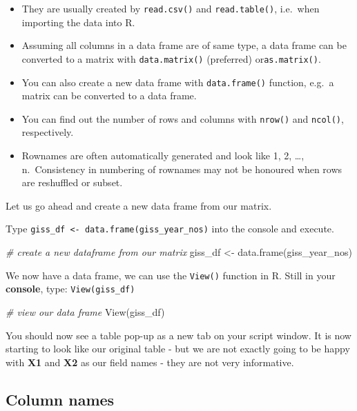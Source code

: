 \documentclass[
]{book}
\newenvironment{Shaded}{\begin{snugshade}}{\end{snugshade}}
\newcommand{\CommentTok}[1]{\textcolor[rgb]{0.56,0.35,0.01}{\textit{#1}}}
\newcommand{\FunctionTok}[1]{\textcolor[rgb]{0.00,0.00,0.00}{#1}}
\newcommand{\NormalTok}[1]{#1}
\newcommand{\OtherTok}[1]{\textcolor[rgb]{0.56,0.35,0.01}{#1}}
\providecommand{\tightlist}{%
  \setlength{\itemsep}{0pt}\setlength{\parskip}{0pt}}
\begin{document}
\begin{itemize}
\tightlist
\item
  They are usually created by \texttt{read.csv()} and \texttt{read.table()}, i.e.~when importing the data into R.
\item
  Assuming all columns in a data frame are of same type, a data frame can be converted to a matrix with \texttt{data.matrix()} (preferred) or\texttt{as.matrix()}.
\item
  You can also create a new data frame with \texttt{data.frame()} function, e.g.~a matrix can be converted to a data frame.
\item
  You can find out the number of rows and columns with \texttt{nrow()} and \texttt{ncol()}, respectively.
\item
  Rownames are often automatically generated and look like 1, 2, \ldots, n.~Consistency in numbering of rownames may not be honoured when rows are reshuffled or subset.
\end{itemize}

Let us go ahead and create a new data frame from our matrix.

Type \texttt{giss\_df\ \textless{}-\ data.frame(giss\_year\_nos)} into the console and execute.

\begin{Shaded}
\begin{Highlighting}[]
\CommentTok{\# create a new dataframe from our matrix}
\NormalTok{giss\_df }\OtherTok{\textless{}{-}} \FunctionTok{data.frame}\NormalTok{(giss\_year\_nos)}
\end{Highlighting}
\end{Shaded}

We now have a data frame, we can use the \texttt{View()} function in R. Still in your \textbf{console}, type: \texttt{View(giss\_df)}

\begin{Shaded}
\begin{Highlighting}[]
\CommentTok{\# view our data frame}
\FunctionTok{View}\NormalTok{(giss\_df)}
\end{Highlighting}
\end{Shaded}

You should now see a table pop-up as a new tab on your script window. It is now starting to look like our original table - but we are not exactly going to be happy with \textbf{X1} and \textbf{X2} as our field names - they are not very informative.

\hypertarget{column-names}{%
\subsection{Column names}\label{column-names}}
\end{document}
